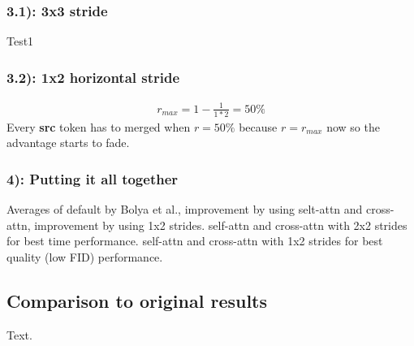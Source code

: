 \subsubsection*{3.1): 3x3 stride}
Test1
\subsubsection*{3.2): 1x2 horizontal stride}
\begin{align*}
    r_{max} = 1-\frac{1}{1*2} = 50\%
\end{align*}
Every  \textbf{src} token has to merged when \(r=50\%\) because \(r=r_{max}\) now so the advantage starts to fade.

\newpage
\begin{figure}
    
    
\end{figure}
\subsubsection*{4): Putting it all together}
Averages of default by Bolya et al.\cite{bolya2023tomesd}, improvement by using selt-attn and cross-attn, improvement by using 1x2 strides. 
self-attn and cross-attn with 2x2 strides for best time performance. self-attn and cross-attn with 1x2 strides for best quality (low FID) performance.

\newpage
\subsection{Comparison to original results}
Text.
